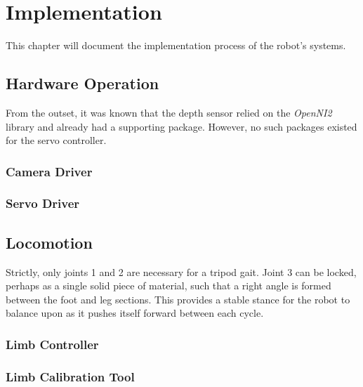 \chapter{Implementation}


This chapter will document the implementation process of the robot's systems.


\section{Hardware Operation}

From the outset, it was known that the depth sensor relied on the \emph{OpenNI2} library and already had a supporting package. However, no such packages existed for the servo controller.

\subsection{Camera Driver}
\subsection{Servo Driver}


\section{Locomotion}

Strictly, only joints 1 and 2 are necessary for a tripod gait. Joint 3 can be locked, perhaps as a single solid piece of material, such that a right angle is formed between the foot and leg sections. This provides a stable stance for the robot to balance upon as it pushes itself forward between each cycle.

\subsection{Limb Controller}
\subsection{Limb Calibration Tool}
